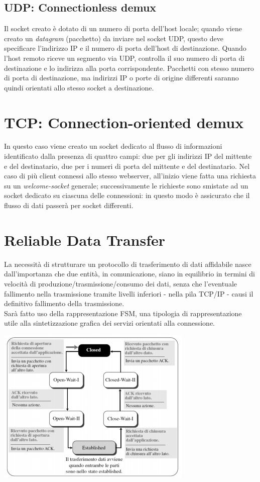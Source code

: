 \subsection{UDP: Connectionless demux}
Il socket creato è dotato di un numero di porta dell'host locale; quando viene creato un \textit{datagram} (pacchetto) da inviare nel socket UDP, questo deve specificare l'indirizzo IP e il numero di porta dell'host di destinazione.
Quando l'host remoto riceve un segmento via UDP, controlla il suo numero di porta di destinazione e lo indirizza alla porta corrispondente.
Pacchetti con stesso numero di porta di destinazione, ma indirizzi IP o porte di origine differenti saranno quindi orientati allo stesso socket a destinazione.

\section{TCP: Connection-oriented demux}
In questo caso viene creato un socket dedicato al flusso di informazioni identificato dalla presenza di quattro campi: due per gli indirizzi IP del mittente e del destinatario, due per i numeri di porta del mittente e del destinatario.
Nel caso di più client connessi allo stesso webserver, all'inizio viene fatta una richiesta su un \textit{welcome-socket} generale; successivamente le richieste sono smistate ad un socket dedicato su ciascuna delle connessioni: in questo modo è assicurato che il flusso di dati passerà per socket differenti.
\newpage

\section{Reliable Data Transfer}
La necessità di strutturare un protocollo di trasferimento di dati affidabile nasce dall'importanza che due entità, in comunicazione, siano in equilibrio in termini di velocità di produzione/trasmissione/consumo dei dati, senza che l'eventuale fallimento nella trasmissione tramite livelli inferiori - nella pila TCP/IP - causi il definitivo fallimento della trasmissione. \\
Sarà fatto uso della rappresentazione FSM, una tipologia di rappresentazione utile alla sintetizzazione grafica dei servizi orientati alla connessione.
\begin{center}
    \includegraphics[width=.7\textwidth]{res/fsm.jpg} \hfill
\end{center}

